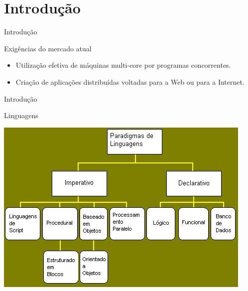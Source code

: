 \section{Introdução}
\begin{frame}{Introdução}
	\begin{block}{Exigências do mercado atual}
		\begin{itemize}
			\item Utilização efetiva de máquinas multi-core por programas concorrentes. 
			\item Criação de aplicações distribuídas voltadas para a Web ou para a Internet.
		\end{itemize}
	\end{block}
\end{frame}

\begin{frame}{Introdução}
    \begin{block}{Linguagens}
        \begin{center}
	        \includegraphics[scale=0.4]{introducao/paradigmas-imagem.png}
        \end{center}
    \end{block}
\end{frame}

